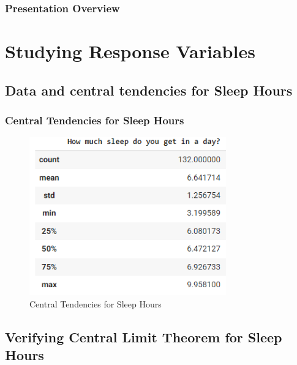 \documentclass[11pt,]{beamer}
\begin{document}
\begin{frame}

	\frametitle{Presentation Overview} 
	
	\tableofcontents
	
\end{frame}

\section{Studying Response Variables}

\subsection{Data and central tendencies for Sleep Hours}

\begin{frame}

    \frametitle{Central Tendencies for Sleep Hours}
    
    \begin{figure}
		\includegraphics[width=8.5cm]{DF_SLP_Hours.png}
		\caption{Central Tendencies for Sleep Hours}
	\end{figure}
    
\end{frame}

\subsection{Verifying Central Limit Theorem for Sleep Hours}
\end{document}
